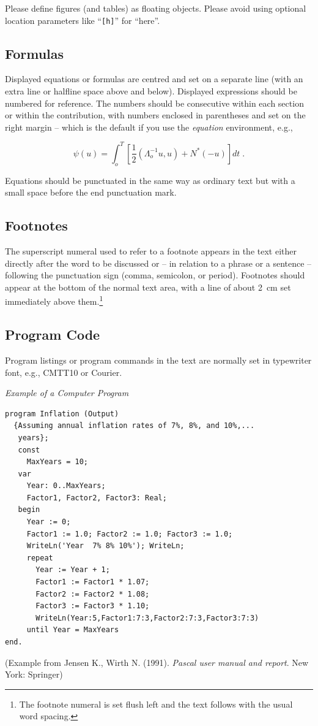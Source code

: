 \documentclass[runningheads,a4paper]{llncs}
\begin{document}
Please define figures (and tables) as floating objects. Please avoid
using optional location parameters like ``\verb+[h]+'' for ``here''.

\subsection{Formulas}

Displayed equations or formulas are centred and set on a separate
line (with an extra line or halfline space above and below). Displayed
expressions should be numbered for reference. The numbers should be
consecutive within each section or within the contribution,
with numbers enclosed in parentheses and set on the right margin --
which is the default if you use the \emph{equation} environment, e.g.,

\begin{equation}
  \psi (u) = \int_{o}^{T} \left[\frac{1}{2}
  \left(\Lambda_{o}^{-1} u,u\right) + N^{\ast} (-u)\right] dt \;  .
\end{equation}

Equations should be punctuated in the same way as ordinary
text but with a small space before the end punctuation mark.

\subsection{Footnotes}

The superscript numeral used to refer to a footnote appears in the text
either directly after the word to be discussed or -- in relation to a
phrase or a sentence -- following the punctuation sign (comma,
semicolon, or period). Footnotes should appear at the bottom of
the normal text area, with a line of about 2~cm set
immediately above them.\footnote{The footnote numeral is set flush left
and the text follows with the usual word spacing.}

\subsection{Program Code}

Program listings or program commands in the text are normally set in
typewriter font, e.g., CMTT10 or Courier.

\medskip

\noindent
{\it Example of a Computer Program}
\begin{verbatim}
program Inflation (Output)
  {Assuming annual inflation rates of 7%, 8%, and 10%,...
   years};
   const
     MaxYears = 10;
   var
     Year: 0..MaxYears;
     Factor1, Factor2, Factor3: Real;
   begin
     Year := 0;
     Factor1 := 1.0; Factor2 := 1.0; Factor3 := 1.0;
     WriteLn('Year  7% 8% 10%'); WriteLn;
     repeat
       Year := Year + 1;
       Factor1 := Factor1 * 1.07;
       Factor2 := Factor2 * 1.08;
       Factor3 := Factor3 * 1.10;
       WriteLn(Year:5,Factor1:7:3,Factor2:7:3,Factor3:7:3)
     until Year = MaxYears
end.
\end{verbatim}
%
\noindent
{\small (Example from Jensen K., Wirth N. (1991). \textit{Pascal user manual and
report}. New York: Springer)}
\end{document}
